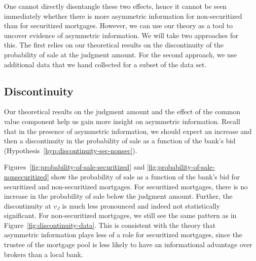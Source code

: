 \documentclass[11pt,twopage]{article}
\begin{document}
One cannot directly disentangle these two effects, hence it cannot be
seen immediately whether there is more asymmetric information for
non-securitized than for securitized mortgages. However, we can use
our theory as a tool to uncover evidence of asymmetric information. We
will take two approaches for this. The first relies on our theoretical
results on the discontinuity of the probability of sale at the
judgment amount. For the second approach, we use additional data that
we hand collected for a subset of the data set.

\subsection{Discontinuity}


Our theoretical results on the judgment amount and the effect of the
common value component help us gain more insight on asymmetric
information. Recall that in the presence of asymmetric information, we
should expect an increase and then a discontinuity in the probability
of sale as a function of the bank's bid
(Hypothesis~\ref{hyp:discontinuity-sec-nonsec}).

Figures~\ref{fig:probability-of-sale-securitized} and
\ref{fig:probability-of-sale-nonsecuritized} show the probability of
sale as a function of the bank's bid for securitized and
non-securitized mortgages. For securitized mortgages, there is no
increase in the probability of sale below the judgment
amount. Further, the discontinuity at $v_J$ is much less pronounced
and indeed not statistically significant. For non-securitized
mortgages, we still see the same pattern as in
Figure~\ref{fig:discontinuity-data}. This is consistent with the
theory that asymmetric information plays less of a role for
securitized mortgages, since the trustee of the mortgage pool is less
likely to have an informational advantage over brokers than a local
bank.
\end{document}
